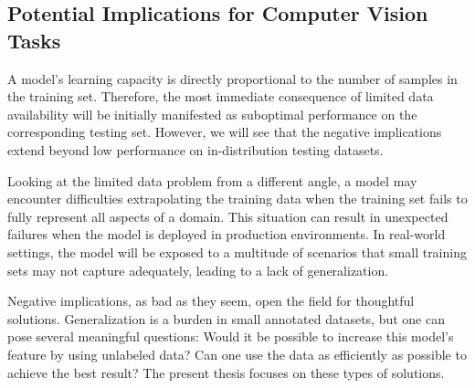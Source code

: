 \subsection{Potential Implications for Computer Vision Tasks}\label{subsec:potential_implications}
A model's learning capacity is directly proportional to the number of samples in the training set. Therefore, the most immediate consequence of limited data availability will be initially manifested as suboptimal performance on the corresponding testing set. However, we will see that the negative implications extend beyond low performance on in-distribution testing datasets.

Looking at the limited data problem from a different angle, a model may encounter difficulties extrapolating the training data when the training set fails to fully represent all aspects of a domain. This situation can result in unexpected failures when the model is deployed in production environments. In real-world settings, the model will be exposed to a multitude of scenarios that small training sets may not capture adequately, leading to a lack of generalization.

Negative implications, as bad as they seem, open the field for thoughtful solutions. Generalization is a burden in small annotated datasets, but one can pose several meaningful questions: Would it be possible to increase this model's feature by using unlabeled data? Can one use the data as efficiently as possible to achieve the best result? The present thesis focuses on these types of solutions.